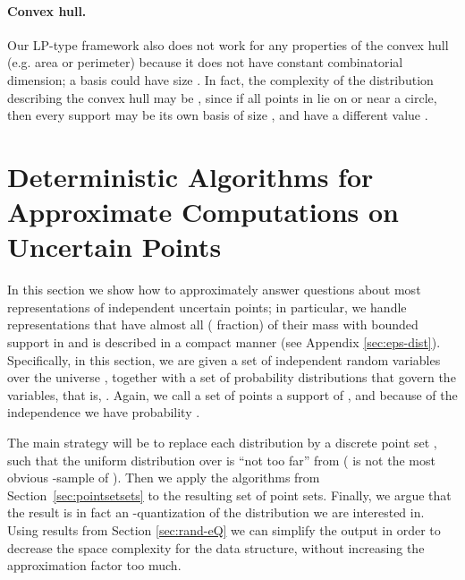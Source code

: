 \documentclass{journal}
\newcommand{\pset}{support\xspace}
\begin{document}
\paragraph{Convex hull.}
Our LP-type framework also does not work for any properties of the convex hull (e.g. area or perimeter) because it does not have constant combinatorial dimension; a basis could have size .   In fact, the complexity of the distribution describing the convex hull may be , since if all points in  lie on or near a circle, then every \pset  may be its own basis of size , and have a different value .  



































\section {Deterministic Algorithms for Approximate Computations on Uncertain Points}
\label {sec:distributions}

In this section we show how to approximately answer questions about most representations of independent uncertain points; in particular, we handle representations that have almost all ( fraction) of their mass with bounded support in  and is described in a compact manner (see Appendix \ref{sec:eps-dist}).  
Specifically, in this section, we are given a set  of  independent random variables over the universe , together with a set  of  probability distributions that govern the variables, that is, .
Again, we call a set of points  a \pset of , and because of the independence we have probability .

    The main strategy will be to replace each distribution  by a discrete point set , such that the uniform distribution over  is ``not too far'' from  ( is not the most obvious -sample of ). Then we apply the algorithms from Section~\ref {sec:pointsetsets} to the resulting set of point sets. Finally, we argue that the result is in fact an -quantization of the distribution we are interested in.   Using results from Section \ref{sec:rand-eQ} we can simplify the output in order to decrease the space complexity for the data structure, without increasing the approximation factor too much.
\end{document}
